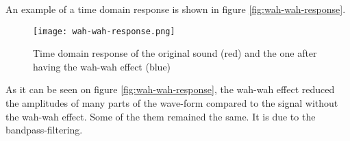An example of a time domain response is shown in figure \autoref{fig:wah-wah-response}.

\begin{figure} [htbp!]
	\centering
	\texttt{[image: wah-wah-response.png]}
	\caption{Time domain response of the original sound (red) and the one after having the wah-wah effect (blue)}
	\label{fig:wah-wah-response}
\end{figure}


As it can be seen on figure \autoref{fig:wah-wah-response}, the wah-wah effect reduced the amplitudes of many parts of the wave-form compared to the signal without the wah-wah effect. Some of the them remained the same. It is due to the bandpass-filtering.
